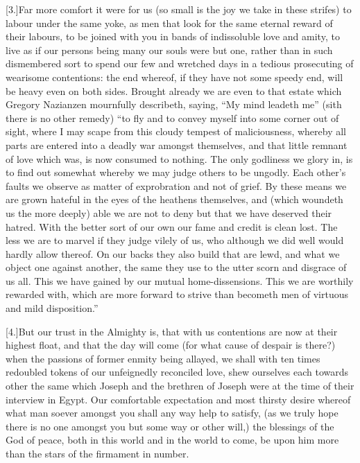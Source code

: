 [3.]Far more comfort it were for us (so small is the joy we take in these strifes) to labour under the same yoke, as men that look for the same eternal reward of their labours, to be joined with you in bands of indissoluble love and amity, to live as if our persons being many our souls were but one, rather than in such dismembered sort to spend our few and wretched days in a tedious prosecuting of wearisome contentions: the end whereof, if they have not some speedy end, will be heavy even on both sides. Brought already we are even to that estate which Gregory Nazianzen mournfully describeth, saying, “My mind leadeth me” (sith there is no other remedy) “to fly and to convey myself into some corner out of sight, where I may scape from this cloudy tempest of maliciousness, whereby all parts are entered into a deadly war amongst themselves, and that little remnant of love which was, is now consumed to nothing. The only godliness we glory in, is to find out somewhat whereby we may judge others to be ungodly. Each other’s faults we observe as matter of exprobration and not of grief. By these means we are grown hateful in the eyes of the heathens themselves, and (which woundeth us the more deeply) able we are not to deny but that we have deserved their hatred. With the better sort of our own our fame and credit is clean lost. The less we are to marvel if they judge vilely of us, who although we did well would hardly allow thereof. On our backs they also build that are lewd, and what we object one against another, the same they use to the utter scorn and disgrace of us all. This we have gained by our mutual home-dissensions. This we are worthily rewarded with, which are more forward to strive than becometh men of virtuous and mild disposition.”

[4.]But our trust in the Almighty is, that with us contentions are now at their
highest float, and that the day will come (for what cause of despair is there?)
when the passions of former enmity being allayed, we shall with ten times
redoubled tokens of our unfeignedly reconciled love, shew ourselves each towards
other the same which Joseph and the brethren of Joseph were at the time of their
interview in Egypt. Our comfortable expectation and most thirsty desire whereof
what man soever amongst you shall any way help to satisfy, (as we truly hope
there is no one amongst you but some way or other will,) the blessings of the
God of peace, both in this world and in the world to come, be upon him more than the stars of the firmament in number.

\PRLsep

